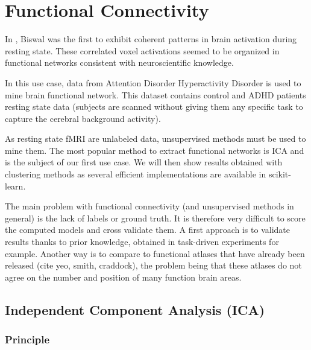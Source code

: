\documentclass{frontiersSCNS} %
\newcounter{x}
\newcounter{y}
\newcounter{z}
\begin{document}
\section{Functional Connectivity}

In \cite{biswal1995}, Biswal was the first to exhibit coherent patterns in
brain activation during resting state. These correlated voxel activations seemed
to be organized in functional networks consistent with neuroscientific knowledge.


In this use case, data from Attention Disorder Hyperactivity Disorder is used to
mine brain functional network. This dataset contains control and ADHD patients
resting state data (subjects are scanned without giving them any specific task
to capture the cerebral background activity).

As resting state fMRI are unlabeled data, unsupervised methods must be used to
mine them. The most popular method to extract functional networks is ICA and
is the subject of our first use case. We will then show results obtained with
clustering methods as several efficient implementations are available in
scikit-learn.

The main problem with functional connectivity (and unsupervised methods in
general) is the lack of labels or ground truth. It is therefore very difficult
to score the computed models and cross validate them. A first approach is to
validate results thanks to prior knowledge, obtained in task-driven experiments
for example. Another way is to compare to functional atlases that have already
been released (cite yeo, smith, craddock), the problem being that these atlases
do not agree on the number
and position of many function brain areas.

\subsection{Independent Component Analysis (ICA)}

\subsubsection{Principle}
\end{document}
